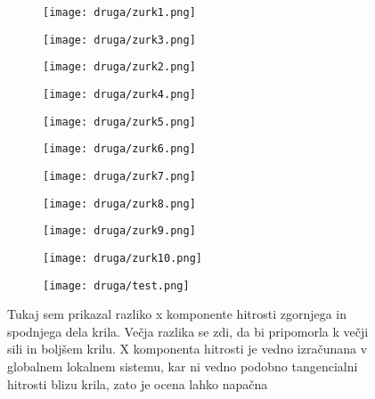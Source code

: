 \documentclass{article}
\begin{document}
\begin{figure}[H]
\centering
\begin{subfigure}{.49\textwidth}
\texttt{[image: druga/zurk1.png]}
\end{subfigure}
\begin{subfigure}{.49\textwidth}
\texttt{[image: druga/zurk3.png]}
\end{subfigure}
\caption*{}
\end{figure}

\begin{figure}[H]
\centering
\begin{subfigure}{.49\textwidth}
\texttt{[image: druga/zurk2.png]}
\end{subfigure}
\begin{subfigure}{.49\textwidth}
\texttt{[image: druga/zurk4.png]}
\end{subfigure}
\caption*{}
\end{figure}

\begin{figure}[H]
\centering
\begin{subfigure}{.49\textwidth}
\texttt{[image: druga/zurk5.png]}
\end{subfigure}
\begin{subfigure}{.49\textwidth}
\texttt{[image: druga/zurk6.png]}
\end{subfigure}
\caption*{}
\end{figure}
\begin{figure}[H]
\centering
\begin{subfigure}{.49\textwidth}
\texttt{[image: druga/zurk7.png]}
\end{subfigure}
\begin{subfigure}{.49\textwidth}
\texttt{[image: druga/zurk8.png]}
\end{subfigure}
\caption*{}
\end{figure}

\begin{figure}[H]
\centering
\begin{subfigure}{.49\textwidth}
\texttt{[image: druga/zurk9.png]}
\end{subfigure}
\begin{subfigure}{.49\textwidth}
\texttt{[image: druga/zurk10.png]}
\end{subfigure}
\caption*{}
\end{figure}

\begin{figure}[H]
\centering
\begin{subfigure}{.8\textwidth}
\texttt{[image: druga/test.png]}
\end{subfigure}
\caption*{Tukaj sem prikazal razliko x komponente hitrosti zgornjega in spodnjega dela krila. Večja razlika se zdi, da bi pripomorla k večji sili in boljšem krilu. X komponenta hitrosti je vedno izračunana v globalnem lokalnem sistemu, kar ni vedno podobno tangencialni hitrosti blizu krila, zato je ocena lahko napačna}
\end{figure}
\end{document}
